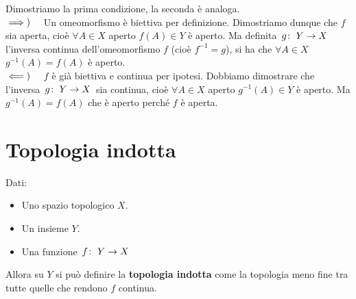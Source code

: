 \begin{demonstration}
Dimostriamo la prima condizione, la seconda è analoga.\\
$\implies)\quad$ Un omeomorfismo è biettiva per definizione. Dimostriamo dunque che $f$ sia aperta, cioè $\forall A\in X$ aperto $f\left(A\right)\in Y$ è aperto. Ma definita $\funz{g}{Y}{X}$ l'inversa continua dell'omeomorfismo $f$ (cioè $f^{-1}=g$), si ha che $\forall A\in X$ $g^{-1}\left(A\right)=f\left(A\right)$ è aperto.\\
$\impliedby)\quad$ $f$ è già biettiva e continua per ipotesi. Dobbiamo dimostrare che l'inversa $\funz{g}{Y}{X}$ sia continua, cioè $\forall A\in X$ aperto $g^{-1}\left(A\right)\in Y$ è aperto. Ma $g^{-1}\left(A\right)=f\left(A\right)$ che è aperto perché $f$ è aperta.
\end{demonstration}
\section{Topologia indotta}
\begin{define}
Dati:
\begin{itemize}
\item Uno spazio topologico $X$.
\item Un insieme $Y$.
\item Una funzione $\funz{f}{Y}{X}$
\end{itemize}
Allora su $Y$ si può definire la \textbf{topologia indotta} come la topologia meno fine tra tutte quelle che rendono $f$ continua.
\end{define}
